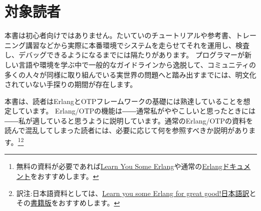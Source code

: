\section*{対象読者}
\label{sec:who-is-this-for}

本書は初心者向けではありません。たいていのチュートリアルや参考書、トレーニング講習などから実際に本番環境でシステムを走らせてそれを運用し、検査し、デバッグできるようになるまでには隔たりがあります。
プログラマーが新しい言語や環境を学ぶ中で一般的なガイドラインから逸脱して、コミュニティの多くの人々が同様に取り組んでいる実世界の問題へと踏み出すまでには、明文化されていない手探りの期間が存在します。

本書は、読者はErlangとOTPフレームワークの基礎には熟達していることを想定しています。
Erlang/OTPの機能は――通常私がややこしいと思ったときには――私が適していると思うように説明しています。通常のErlang/OTPの資料を読んで混乱してしまった読者には、必要に応じて何を参照すべきか説明があります。\footnote{無料の資料が必要であれば\href{http://learnyousomeerlang.com}{Learn You Some Erlang}や通常の\href{http://www.erlang.org/erldoc}{Erlangドキュメント}をおすすめします。}\footnote{訳注:日本語資料としては、\href{https://www.ymotongpoo.com/works/lyse-ja/}{Learn you some Erlang for great good!日本語訳}とその\href{http://shop.ohmsha.co.jp/shopdetail/000000003873/}{書籍版}をおすすめします。}

